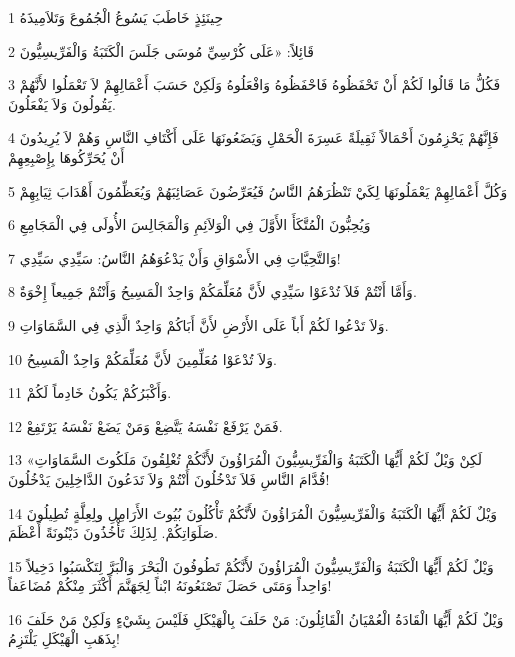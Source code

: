 \par 1 حِينَئِذٍ خَاطَبَ يَسُوعُ الْجُمُوعَ وَتَلاَمِيذَهُ
\par 2 قَائِلاً: «عَلَى كُرْسِيِّ مُوسَى جَلَسَ الْكَتَبَةُ وَالْفَرِّيسِيُّونَ
\par 3 فَكُلُّ مَا قَالُوا لَكُمْ أَنْ تَحْفَظُوهُ فَاحْفَظُوهُ وَافْعَلُوهُ وَلَكِنْ حَسَبَ أَعْمَالِهِمْ لاَ تَعْمَلُوا لأَنَّهُمْ يَقُولُونَ وَلاَ يَفْعَلُونَ.
\par 4 فَإِنَّهُمْ يَحْزِمُونَ أَحْمَالاً ثَقِيلَةً عَسِرَةَ الْحَمْلِ وَيَضَعُونَهَا عَلَى أَكْتَافِ النَّاسِ وَهُمْ لاَ يُرِيدُونَ أَنْ يُحَرِّكُوهَا بِإِصْبِعِهِمْ
\par 5 وَكُلَّ أَعْمَالِهِمْ يَعْمَلُونَهَا لِكَيْ تَنْظُرَهُمُ النَّاسُ فَيُعَرِّضُونَ عَصَائِبَهُمْ وَيُعَظِّمُونَ أَهْدَابَ ثِيَابِهِمْ
\par 6 وَيُحِبُّونَ الْمُتَّكَأَ الأَوَّلَ فِي الْوَلاَئِمِ وَالْمَجَالِسَ الأُولَى فِي الْمَجَامِعِ
\par 7 وَالتَّحِيَّاتِ فِي الأَسْوَاقِ وَأَنْ يَدْعُوَهُمُ النَّاسُ: سَيِّدِي سَيِّدِي!
\par 8 وَأَمَّا أَنْتُمْ فَلاَ تُدْعَوْا سَيِّدِي لأَنَّ مُعَلِّمَكُمْ وَاحِدٌ الْمَسِيحُ وَأَنْتُمْ جَمِيعاً إِخْوَةٌ.
\par 9 وَلاَ تَدْعُوا لَكُمْ أَباً عَلَى الأَرْضِ لأَنَّ أَبَاكُمْ وَاحِدٌ الَّذِي فِي السَّمَاوَاتِ.
\par 10 وَلاَ تُدْعَوْا مُعَلِّمِينَ لأَنَّ مُعَلِّمَكُمْ وَاحِدٌ الْمَسِيحُ.
\par 11 وَأَكْبَرُكُمْ يَكُونُ خَادِماً لَكُمْ.
\par 12 فَمَنْ يَرْفَعْ نَفْسَهُ يَتَّضِعْ وَمَنْ يَضَعْ نَفْسَهُ يَرْتَفِعْ.
\par 13 «لَكِنْ وَيْلٌ لَكُمْ أَيُّهَا الْكَتَبَةُ وَالْفَرِّيسِيُّونَ الْمُرَاؤُونَ لأَنَّكُمْ تُغْلِقُونَ مَلَكُوتَ السَّمَاوَاتِ قُدَّامَ النَّاسِ فَلاَ تَدْخُلُونَ أَنْتُمْ وَلاَ تَدَعُونَ الدَّاخِلِينَ يَدْخُلُونَ!
\par 14 وَيْلٌ لَكُمْ أَيُّهَا الْكَتَبَةُ وَالْفَرِّيسِيُّونَ الْمُرَاؤُونَ لأَنَّكُمْ تَأْكُلُونَ بُيُوتَ الأَرَامِلِ ولِعِلَّةٍ تُطِيلُونَ صَلَوَاتِكُمْ. لِذَلِكَ تَأْخُذُونَ دَيْنُونَةً أَعْظَمَ.
\par 15 وَيْلٌ لَكُمْ أَيُّهَا الْكَتَبَةُ وَالْفَرِّيسِيُّونَ الْمُرَاؤُونَ لأَنَّكُمْ تَطُوفُونَ الْبَحْرَ وَالْبَرَّ لِتَكْسَبُوا دَخِيلاً وَاحِداً وَمَتَى حَصَلَ تَصْنَعُونَهُ ابْناً لِجَهَنَّمَ أَكْثَرَ مِنْكُمْ مُضَاعَفاً!
\par 16 وَيْلٌ لَكُمْ أَيُّهَا الْقَادَةُ الْعُمْيَانُ الْقَائِلُونَ: مَنْ حَلَفَ بِالْهَيْكَلِ فَلَيْسَ بِشَيْءٍ وَلَكِنْ مَنْ حَلَفَ بِذَهَبِ الْهَيْكَلِ يَلْتَزِمُ!
